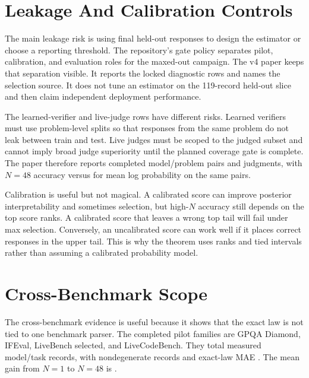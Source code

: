 \section{Leakage And Calibration Controls}
\label{app:leakage}

The main leakage risk is using final held-out responses to design the
estimator or choose a reporting threshold. The repository's gate policy
separates pilot, calibration, and evaluation roles for the maxed-out campaign.
The v4 paper keeps that separation visible. It reports the locked diagnostic
rows and names the selection source. It does not tune an estimator on the
119-record held-out slice and then claim independent deployment performance.

The learned-verifier and live-judge rows have different risks. Learned
verifiers must use problem-level splits so that responses from the same problem
do not leak between train and test. Live judges must be scoped to the judged
subset and cannot imply broad judge superiority until the planned coverage
gate is complete. The paper therefore reports \EvidenceLiveJudgePairs{} completed
model/problem pairs and \EvidenceLiveJudgeJudgments{} judgments, with $N=48$
accuracy \EvidenceLiveJudgeNFortyEight{} versus \EvidenceLogprobNFortyEight{} for mean log
probability on the same pairs.

Calibration is useful but not magical. A calibrated score can improve
posterior interpretability and sometimes selection, but high-$N$ accuracy still
depends on the top score ranks. A calibrated score that leaves a wrong top tail
will fail under max selection. Conversely, an uncalibrated score can work well
if it places correct responses in the upper tail. This is why the theorem uses
ranks and tied intervals rather than assuming a calibrated probability model.

\section{Cross-Benchmark Scope}
\label{app:cross-scope}

The cross-benchmark evidence is useful because it shows that the exact law is
not tied to one benchmark parser. The completed pilot families are GPQA
Diamond, IFEval, LiveBench selected, and LiveCodeBench. They total
\EvidenceCrossRecords{} measured model/task records, with
\EvidenceCrossNondegenerate{} nondegenerate records and exact-law MAE
\EvidenceCrossMaxMAE{}. The mean gain from $N=1$ to $N=48$ is
\EvidenceCrossMeanGain{}.

